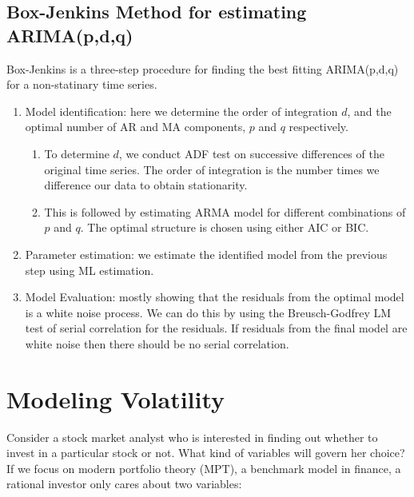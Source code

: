 \documentclass[]{book}
\theoremstyle{definition}
\theoremstyle{definition}
\theoremstyle{definition}
\theoremstyle{remark}
\begin{document}
\hypertarget{box-jenkins-method-for-estimating-arimapdq}{%
\section{Box-Jenkins Method for estimating ARIMA(p,d,q)}\label{box-jenkins-method-for-estimating-arimapdq}}

Box-Jenkins is a three-step procedure for finding the best fitting ARIMA(p,d,q) for a non-statinary time series.

\begin{enumerate}
\def\labelenumi{\arabic{enumi}.}
\item
  Model identification: here we determine the order of integration \(d\), and the optimal number of AR and MA components, \(p\) and \(q\) respectively.

  \begin{enumerate}
  \def\labelenumii{\roman{enumii}.}
  \item
    To determine \(d\), we conduct ADF test on successive differences of the original time series. The order of integration is the number times we difference our data to obtain stationarity.
  \item
    This is followed by estimating ARMA model for different combinations of \(p\) and \(q\). The optimal structure is chosen using either AIC or BIC.
  \end{enumerate}
\item
  Parameter estimation: we estimate the identified model from the previous step using ML estimation.
\item
  Model Evaluation: mostly showing that the residuals from the optimal model is a white noise process. We can do this by using the Breusch-Godfrey LM test of serial correlation for the residuals. If residuals from the final model are white noise then there should be no serial correlation.
\end{enumerate}

\hypertarget{modeling-volatility}{%
\chapter{Modeling Volatility}\label{modeling-volatility}}

Consider a stock market analyst who is interested in finding out whether to invest in a particular stock or not. What kind of variables will govern her choice? If we focus on modern portfolio theory (MPT), a benchmark model in finance, a rational investor only cares about two variables:
\end{document}
